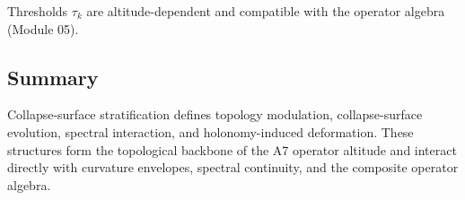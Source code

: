 Thresholds $\tau_k$ are altitude-dependent and compatible with the operator
algebra (Module 05).

\subsection{Summary}
Collapse-surface stratification defines topology modulation, collapse-surface
evolution, spectral interaction, and holonomy-induced deformation. These
structures form the topological backbone of the A7 operator altitude and
interact directly with curvature envelopes, spectral continuity, and the
composite operator algebra.

